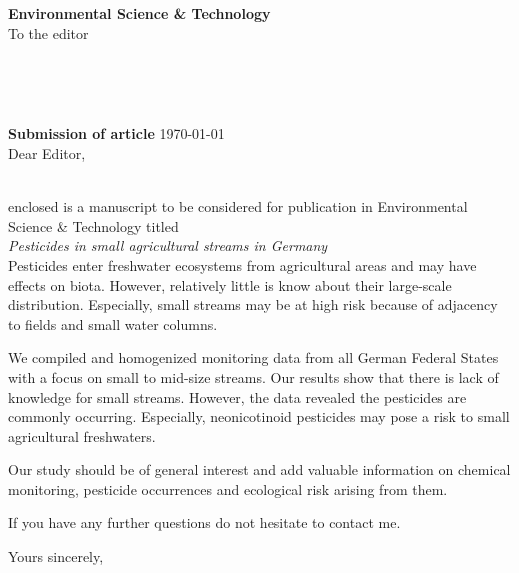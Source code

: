 \documentclass[11pt,a4paper]{letter} %
\def\opening#1{
\thispagestyle{empty}
{\centering\fromaddress \vspace{0.5in} \\} 
{\raggedright \toname \\ \toaddress \par} %
\vspace{2em}
\noindent
\textbf{Submission of article} \hspace*{\fill}\today \\[2em]
\vspace{0.6in} %
\noindent #1 %
}
\begin{document}

\begin{letter}
{
\textbf{Environmental Science \& Technology} \\
\vspace{1em}
To the editor
}

\setlength\parindent{0pt}




\opening{Dear Editor,}
\vspace{-1em}\\
enclosed is a manuscript to be considered for publication in Environmental Science \& Technology titled \\

\emph{Pesticides in small agricultural streams in Germany}\\

Pesticides enter freshwater ecosystems from agricultural areas and may have effects on biota.
However, relatively little is know about their large-scale distribution.
Especially, small streams may be at high risk because of adjacency to fields and small water columns. 

We compiled and homogenized monitoring data from all German Federal States with a focus on small to mid-size streams. 
Our results show that there is lack of knowledge for small streams. 
However, the data revealed the pesticides are commonly occurring.
Especially, neonicotinoid pesticides may pose a risk to small agricultural freshwaters.

Our study should be of general interest and add valuable information on chemical monitoring, pesticide occurrences and ecological risk arising from them.


If you have any further questions do not hesitate to contact me.

\closing{Yours sincerely, }


\end{letter}
\end{document}
